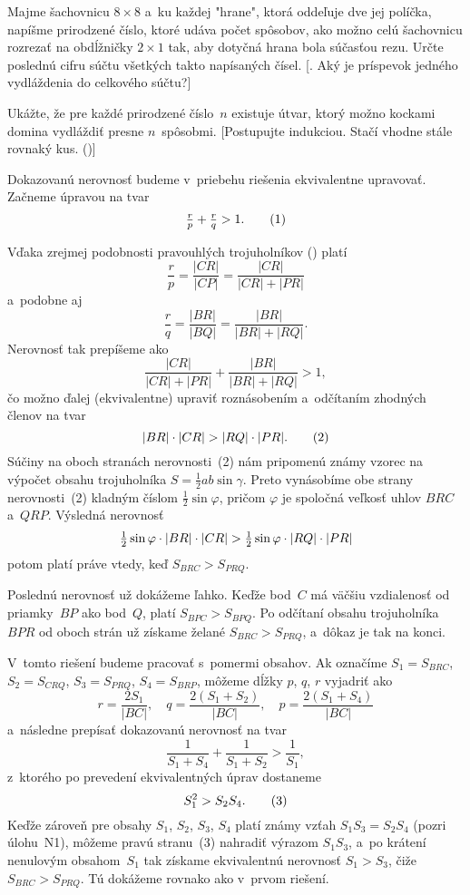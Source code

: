 {Majme šachovnicu $8\times8$ a~ku každej "hrane", ktorá
oddeľuje dve jej políčka, napíšme prirodzené číslo, ktoré udáva počet
spôsobov, ako možno celú šachovnicu
rozrezať na obdĺžničky
$2\times1$ tak, aby dotyčná hrana bola
súčasťou rezu.
Určte poslednú cifru súčtu všetkých takto napísaných čísel.
[. Aký je príspevok jedného vydláždenia do
celkového súčtu?]

Ukážte, že pre každé prirodzené číslo~$n$ existuje útvar,
ktorý možno kockami domina vydláždiť presne $n$~spôsobmi. [Postupujte indukciou.
Stačí vhodne  stále rovnaký kus. (\obr)]
%
}

{%
Dokazovanú nerovnosť budeme v~priebehu riešenia ekvivalentne upravovať.
Začneme úpravou na tvar
$$
\frac{r}{p}+\frac{r}{q} > 1. \tag1
$$
%

Vďaka zrejmej podobnosti pravouhlých trojuholníkov (\obr) platí
$$
\frac{r}{p}=\frac{|CR|}{|CP|}=\frac{|CR|}{|CR|+|PR|}
$$
a~podobne aj
$$
\frac{r}{q}=\frac{|BR|}{|BQ|}=\frac{|BR|}{|BR|+|RQ|}.
$$
Nerovnosť  tak prepíšeme ako
$$
\frac{|CR|}{|CR|+|PR|}+\frac{|BR|}{|BR|+|RQ|} > 1,
$$
čo možno ďalej (ekvivalentne) upraviť roznásobením a~odčítaním zhodných
členov na tvar
$$
|BR|\cdot |CR| > |RQ| \cdot |PR|.\tag2
$$
Súčiny na oboch stranách nerovnosti~(2) nám pripomenú známy
vzorec na výpočet obsahu trojuholníka $S= \frac12 ab \sin \gamma$.
Preto vynásobíme obe strany nerovnosti~(2) kladným číslom $\frac12 \sin\varphi$,
pričom $\varphi$ je spoločná veľkosť uhlov $BRC$ a~$QRP$. Výsledná
nerovnosť
$$
\postdisplaypenalty 10000
\frac12 \sin \varphi \cdot|BR|\cdot |CR| > \frac12 \sin \varphi\cdot|RQ| \cdot |PR|
$$
potom platí práve vtedy, keď $S_{BRC} > S_{PRQ}$.

Poslednú nerovnosť už dokážeme ľahko. Keďže bod~$C$ má väčšiu
vzdialenosť od priamky~$BP$ ako bod~$Q$, platí $S_{BPC} > S_{BPQ}$. Po
odčítaní obsahu trojuholníka $BPR$ od oboch strán už získame želané
$S_{BRC} > S_{PRQ}$, a~dôkaz je tak na konci.

\ineres
V~tomto riešení budeme pracovať s~pomermi
obsahov. Ak označíme $S_1 = S_{BRC}$, $S_2 = S_{CRQ}$, $S_3 = S_{PRQ}$,
$S_4 = S_{BRP}$, môžeme dĺžky $p$, $q$, $r$ vyjadriť ako
$$
r=\frac{2S_1}{|BC|}, \quad
q=\frac{2(S_1+S_2)}{|BC|}, \quad
p=\frac{2(S_1+S_4)}{|BC|}
$$
a~následne prepísať dokazovanú nerovnosť na tvar
$$
\frac{1}{S_1+S_4}+\frac{1}{S_1+S_2} > \frac{1}{S_1},
$$
z~ktorého po prevedení ekvivalentných úprav dostaneme
$$
S_1^2 > S_2S_4. \tag3
$$
Keďže zároveň pre obsahy $S_1$, $S_2$, $S_3$, $S_4$ platí známy vzťah
$S_1S_3 = S_2S_4$ (pozri úlohu~N1), môžeme pravú stranu~(3) nahradiť výrazom $S_1S_3$,
a~po krátení nenulovým obsahom~$S_1$ tak získame ekvivalentnú nerovnosť $S_1>S_3$,
čiže $S_{BRC} > S_{PRQ}$. Tú dokážeme rovnako ako v~prvom riešení.

}
